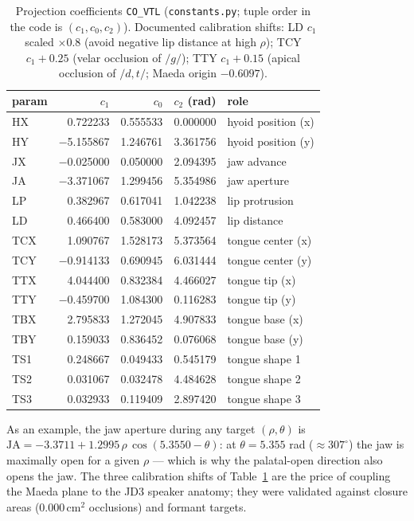 \documentclass[11pt,a4paper]{article}
\begin{document}
\begin{table}[t]
\centering
\small
\begin{tabular}{@{}lrrrl@{}}
\toprule
\textbf{param} & \(c_1\) & \(c_0\) & \(c_2\) (rad) & \textbf{role} \\
\midrule
HX & \phantom{$-$}0.722233 & 0.555533 & 0.000000 & hyoid position (x) \\
HY & $-$5.155867 & 1.246761 & 3.361756 & hyoid position (y) \\
JX & $-$0.025000 & 0.050000 & 2.094395 & jaw advance \\
JA & $-$3.371067 & 1.299456 & 5.354986 & jaw aperture \\
LP & \phantom{$-$}0.382967 & 0.617041 & 1.042238 & lip protrusion \\
LD & \phantom{$-$}0.466400 & 0.583000 & 4.092457 & lip distance \\
TCX & \phantom{$-$}1.090767 & 1.528173 & 5.373564 & tongue center (x) \\
TCY & $-$0.914133 & 0.690945 & 6.031444 & tongue center (y) \\
TTX & \phantom{$-$}4.044400 & 0.832384 & 4.466027 & tongue tip (x) \\
TTY & $-$0.459700 & 1.084300 & 0.116283 & tongue tip (y) \\
TBX & \phantom{$-$}2.795833 & 1.272045 & 4.907833 & tongue base (x) \\
TBY & \phantom{$-$}0.159033 & 0.836452 & 0.076068 & tongue base (y) \\
TS1 & \phantom{$-$}0.248667 & 0.049433 & 0.545179 & tongue shape 1 \\
TS2 & \phantom{$-$}0.031067 & 0.032478 & 4.484628 & tongue shape 2 \\
TS3 & \phantom{$-$}0.032933 & 0.119409 & 2.897420 & tongue shape 3 \\
\bottomrule
\end{tabular}
\caption{Projection coefficients \texttt{CO\_VTL}
(\texttt{constants.py}; tuple order in the code is
\((c_1, c_0, c_2)\)). Documented calibration shifts: LD \(c_1\) scaled
\(\times 0.8\) (avoid negative lip distance at high \(\rho\)); TCY
\(c_1 + 0.25\) (velar occlusion of \(/g/\)); TTY \(c_1 + 0.15\) (apical
occlusion of \(/d, t/\); Maeda origin \(-0.6097\)).}
\label{tab:co}
\end{table}

As an example, the jaw aperture during any target
\((\rho,\theta)\) is
\(\mathrm{JA} = -3.3711 + 1.2995\,\rho\,\cos(5.3550 - \theta)\):
at \(\theta = 5.355\) rad (\(\approx 307^\circ\)) the jaw is maximally
open for a given \(\rho\) --- which is why the palatal-open direction
also opens the jaw. The three calibration shifts of
Table~\ref{tab:co} are the price of coupling the Maeda plane to the JD3
speaker anatomy; they were validated against closure areas
(\(0.000\,\mathrm{cm^2}\) occlusions) and formant targets.
\end{document}
